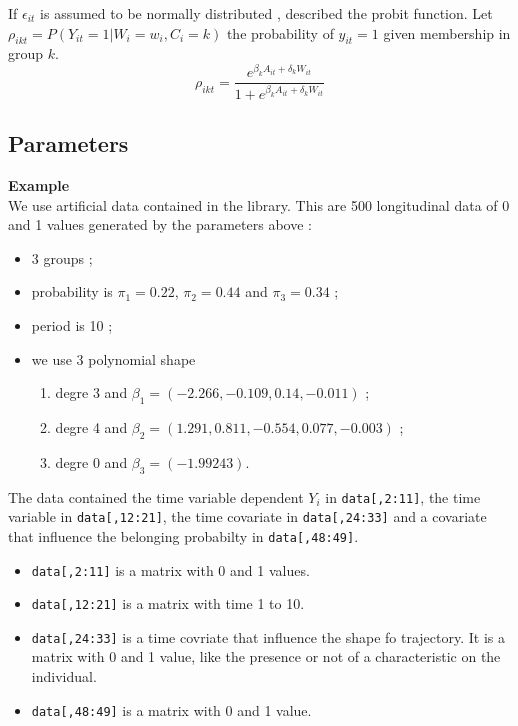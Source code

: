 \documentclass{article}\usepackage[]{graphicx}\usepackage[]{color}
\begin{document}
If $\epsilon_{it}$ is assumed to be normally distributed , described the probit function.
Let $\rho_{ikt}=P(Y_{it}=1|W_i=w_i,C_i=k)$ the probability of $y_{it}=1$ given membership in group $k$.
\begin{equation}
\rho_{ikt}=\dfrac{e^{\beta_k A_{it}+\delta_k W_{it}}}{1+e^{\beta_k A_{it}+\delta_k W_{it}}}
\end{equation}

\subsection{Parameters}

\textbf{Example}\\
We use artificial data contained in the library. This are 500 longitudinal data of 0 and 1 values generated by the parameters above :
\begin{itemize}
	\item 3 groups ;
	\item probability is $\pi_1=0.22$, $\pi_2=0.44$ and $\pi_3=0.34$ ;
	\item period is 10 ;
	\item we use 3 polynomial shape
	\begin{enumerate}
		\item degre 3 and $\beta_1=(-2.266,-0.109,0.14,-0.011)$ ;
		\item degre 4 and $\beta_2=(1.291,0.811,-0.554,0.077,-0.003)$ ;
		\item degre 0 and $\beta_{3}=(-1.99243)$.
	\end{enumerate}
\end{itemize}

The data contained the time variable dependent $Y_i$ in \verb|data[,2:11]|, the time variable in \verb|data[,12:21]|, the time covariate in \verb|data[,24:33]| and a covariate that influence the belonging probabilty in \verb|data[,48:49]|.
\begin{itemize}
	\item \verb|data[,2:11]| is a matrix with 0 and 1 values.
	\item \verb|data[,12:21]| is a matrix with time 1 to 10.
	\item \verb|data[,24:33]| is a time covriate that influence the shape fo trajectory. It is a matrix with 0 and 1 value, like the presence or not of a characteristic on the individual.
	\item \verb|data[,48:49]| is a matrix with 0 and 1 value.
\end{itemize}
\end{document}
